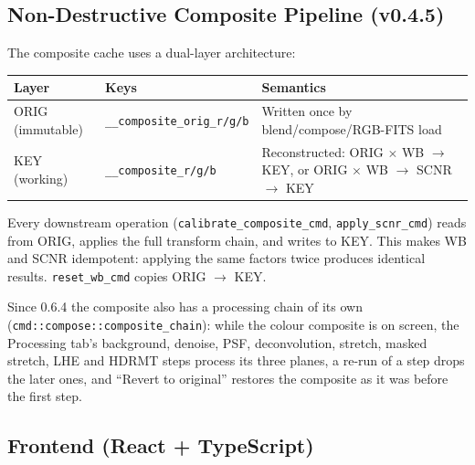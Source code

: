 \documentclass[11pt,a4paper]{article}
\newcommand{\code}[1]{\texttt{\small #1}}
\begin{document}
    \subsection{Non-Destructive Composite Pipeline (v0.4.5)}
    \label{sec:nondestructive}

    The composite cache uses a dual-layer architecture:

    \begin{infobox}
        \begin{center}
            \begin{tabularx}{\linewidth}{llX}
                \toprule
                \textbf{Layer} & \textbf{Keys} & \textbf{Semantics} \\
                \midrule
                ORIG (immutable) & \code{\_\_composite\_orig\_r/g/b} & Written once by blend/compose/RGB-FITS load \\
                KEY (working) & \code{\_\_composite\_r/g/b} & Reconstructed: ORIG $\times$ WB $\to$ KEY, or ORIG $\times$ WB $\to$ SCNR $\to$ KEY \\
                \bottomrule
            \end{tabularx}
        \end{center}
        Every downstream operation (\code{calibrate\_composite\_cmd}, \code{apply\_scnr\_cmd}) reads from ORIG, applies the full transform chain, and writes to KEY. This makes WB and SCNR idempotent: applying the same factors twice produces identical results. \code{reset\_wb\_cmd} copies ORIG $\to$ KEY.
    \end{infobox}

    Since 0.6.4 the composite also has a processing chain of its own (\code{cmd::compose::composite\_chain}): while the colour composite is on screen, the Processing tab's background, denoise, PSF, deconvolution, stretch, masked stretch, LHE and HDRMT steps process its three planes, a re-run of a step drops the later ones, and ``Revert to original'' restores the composite as it was before the first step.

    \subsection{Frontend (React + TypeScript)}
    \label{sec:frontend}
\end{document}
